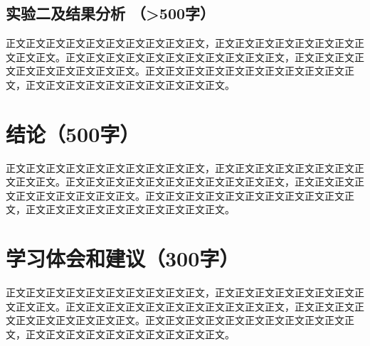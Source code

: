 \documentclass{article}
\begin{document}
\subsection{实验二及结果分析 （>500字）}
正文正文正文正文正文正文正文正文正文正文，正文正文正文正文正文正文正文正文正文正文。正文正文正文正文正文正文正文正文正文正文正文，正文正文正文正文正文正文正文正文正文正文。正文正文正文正文正文正文正文正文正文正文正文，正文正文正文正文正文正文正文正文正文正文。



  
\section{结论（500字）}
正文正文正文正文正文正文正文正文正文正文，正文正文正文正文正文正文正文正文正文正文。正文正文正文正文正文正文正文正文正文正文正文，正文正文正文正文正文正文正文正文正文正文。正文正文正文正文正文正文正文正文正文正文正文，正文正文正文正文正文正文正文正文正文正文。

\section{学习体会和建议（300字）}
正文正文正文正文正文正文正文正文正文正文，正文正文正文正文正文正文正文正文正文正文。正文正文正文正文正文正文正文正文正文正文正文，正文正文正文正文正文正文正文正文正文正文。正文正文正文正文正文正文正文正文正文正文正文，正文正文正文正文正文正文正文正文正文正文。
\end{document}
